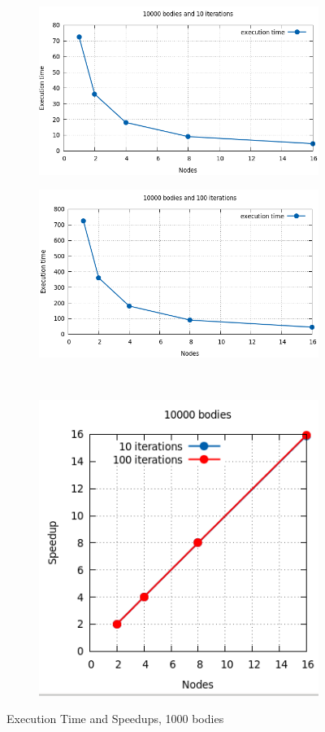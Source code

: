 \documentclass[a4paper]{article}
\begin{document}
\begin{figure}[ht]
\begin{subfigure}{.5\textwidth}
  \centering
  \includegraphics[width=1\linewidth]{results/10000_10}
\end{subfigure} %
\begin{subfigure}{.5\textwidth}
  \centering
  \includegraphics[width=1\linewidth]{results/10000_100}
\end{subfigure} \\ %
\begin{subfigure}{\textwidth}
  \centering
  \includegraphics[width=.4\linewidth]{results/10000}
\end{subfigure} 
  \caption{Execution Time and Speedups, 1000 bodies}
  \label{fig:R3}
\end{figure}
\FloatBarrier
\end{document}
